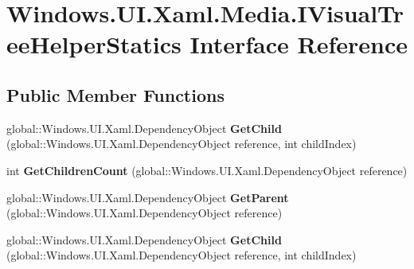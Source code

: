 \hypertarget{interface_windows_1_1_u_i_1_1_xaml_1_1_media_1_1_i_visual_tree_helper_statics}{}\section{Windows.\+U\+I.\+Xaml.\+Media.\+I\+Visual\+Tree\+Helper\+Statics Interface Reference}
\label{interface_windows_1_1_u_i_1_1_xaml_1_1_media_1_1_i_visual_tree_helper_statics}
\subsection*{Public Member Functions}
\begin{DoxyCompactItemize}
\item 
\mbox{\label{interface_windows_1_1_u_i_1_1_xaml_1_1_media_1_1_i_visual_tree_helper_statics_a00c15dcff89839a4bacfb9de1747f0ad}} 
global\+::\+Windows.\+U\+I.\+Xaml.\+Dependency\+Object {\bfseries Get\+Child} (global\+::\+Windows.\+U\+I.\+Xaml.\+Dependency\+Object reference, int child\+Index)
\item 
\mbox{\label{interface_windows_1_1_u_i_1_1_xaml_1_1_media_1_1_i_visual_tree_helper_statics_a19a9de9748e05ab7dafe6fb4c77aa8c4}} 
int {\bfseries Get\+Children\+Count} (global\+::\+Windows.\+U\+I.\+Xaml.\+Dependency\+Object reference)
\item 
\mbox{\label{interface_windows_1_1_u_i_1_1_xaml_1_1_media_1_1_i_visual_tree_helper_statics_afa2a74a737472e8406e293600f259a5d}} 
global\+::\+Windows.\+U\+I.\+Xaml.\+Dependency\+Object {\bfseries Get\+Parent} (global\+::\+Windows.\+U\+I.\+Xaml.\+Dependency\+Object reference)
\item 
\mbox{\label{interface_windows_1_1_u_i_1_1_xaml_1_1_media_1_1_i_visual_tree_helper_statics_a00c15dcff89839a4bacfb9de1747f0ad}} 
global\+::\+Windows.\+U\+I.\+Xaml.\+Dependency\+Object {\bfseries Get\+Child} (global\+::\+Windows.\+U\+I.\+Xaml.\+Dependency\+Object reference, int child\+Index)

\end{DoxyCompactItemize}
